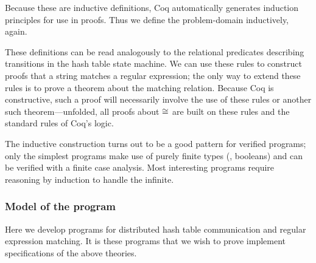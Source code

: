 
Because these are inductive definitions, Coq automatically generates induction
principles for use in proofs. Thus we define the problem-domain inductively,
again.

These definitions can be read analogously to the relational predicates
describing transitions in the hash table state machine. We can use these rules
to construct proofs that a string matches a regular expression; the only way to
extend these rules is to prove a theorem about the matching relation. Because
Coq is constructive, such a proof will necessarily involve the use of these
rules or another such theorem---unfolded, all proofs about \(\mathrel{\cong}\) are built
on these rules and the standard rules of Coq's logic.

The inductive construction turns out to be a good pattern for verified programs;
only the simplest programs make use of purely finite types (\eg, booleans) and
can be verified with a finite case analysis. Most interesting programs require
reasoning by induction to handle the infinite.

\subsubsection{Model of the program}\label{S:ex_program}

Here we develop programs for distributed hash table communication and
regular expression matching. It is these programs that we wish to prove
implement specifications of the above theories.

